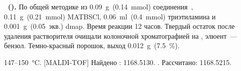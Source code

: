 \textbf{~().} 
По общей методике из \SI{0.09}{\gram}~(\SI{0.14}{\milli\mole}) соединения~, \SI{0.11}{\gram}~(\SI{0.21}{\milli\mole}) MATBSCl, \SI{0.06}{\milli\litre}~(\SI{0.4}{\milli\mole}) триэтиламина и \SI{0.001}{\gram}~(0.05~экв.) \ac{dmap}.
Время реакции 12 часов. Твердый остаток после удаления растворителя очищали колоночной хроматографией на , элюент~--- бензол.
Темно-красный порошок, выход \SI{0.012}{\gram}~(\SI{7.5}{\percent}).
\begin{experimental}
     147--\SI{150}{\celsius}.
    [MALDI-TOF] Найдено \ce{[M + H]+}: \num{1168.5130}. . Рассчитано: \ce{[M + H]} \num{1168.5215}.
\end{experimental}
